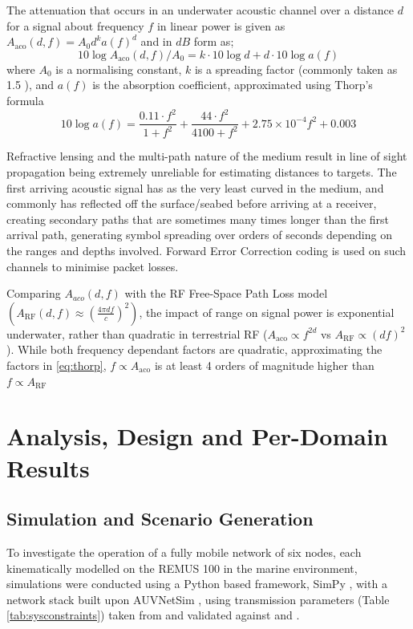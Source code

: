 \documentclass{aamas2016}
\begin{document}
The attenuation that occurs in an underwater acoustic channel over a distance $d$ for a signal about frequency $f$ in linear power is given as $A_{\text{aco}}(d,f) = A_0d^ka(f)^d$ and in $dB$ form as;
%
\begin{equation}
\label{eq:acoattenuationdb}
10 \log A_{\text{aco}}(d,f)/A_0 = k \cdot 10 \log d + d \cdot 10 \log a(f)
\end{equation}
%
where $A_0$ is a normalising constant, $k$ is a spreading factor (commonly taken as 1.5  \cite{Stojanovic2007}), and $a(f)$ is the absorption coefficient, approximated using Thorp's formula \cite{Stefanov2011}
%
\begin{equation}
\label{eq:thorp}
10 \log a(f) = \frac{0.11 \cdot f^2}{1+f^2} + \frac{44\cdot f^2}{4100+f^2}+ 2.75\times10^{-4} f^2 + 0.003
\end{equation}
%

Refractive lensing and the multi-path nature of the medium result in line of sight propagation being extremely unreliable for estimating distances to targets.
The first arriving acoustic signal has as the very least curved in the medium, and commonly has reflected off the surface/seabed before arriving at a receiver, creating secondary paths that are sometimes many times longer than the first arrival path, generating symbol spreading over orders of seconds depending on the ranges and depths involved.
Forward Error Correction coding is used on such channels to minimise packet losses.

Comparing $A_{aco}(d,f)$ with the RF Free-Space Path Loss model $(A_{\text{RF}}(d,f) \approx \left( \frac{4\pi d f}{c} \right)^2)$, the impact of range on signal power is exponential underwater, rather than quadratic in terrestrial RF ($A_{\text{aco}} \propto f^{2d}$ vs $A_{\text{RF}} \propto (df)^2$). 
While both frequency dependant factors are quadratic, approximating the factors in \eqref{eq:thorp}, $f\propto A_{\text{aco}}$ is at least 4 orders of magnitude higher than $f\propto A_{\text{RF}}$


\section{Analysis, Design and Per-Domain Results}


\subsection{Simulation and Scenario Generation}
To investigate the operation of a fully mobile network of six nodes, each kinematically modelled on the REMUS 100 \cite{Milgram2001} in the marine environment, simulations were conducted using a Python based framework, SimPy \cite{Mueller2003SimPy}, with a network stack built upon AUVNetSim \cite{Miquel2008}, using transmission parameters (Table \ref{tab:sysconstraints}) taken from and validated against \cite{Stojanovic2007} and \cite{Stefanov2011}.
\end{document}
